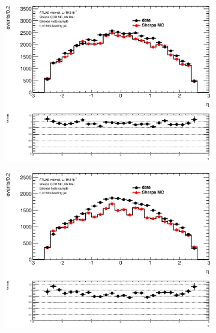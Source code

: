 \begin{figure}[phtb!]
\begin{center}
  \begin{subfigure}[$bbloose$ 4 jet category]{0.3\textwidth}\includegraphics[width=\textwidth]{MonteCarlo/figures/eta2_bbloose_4jets.eps}\end{subfigure}
  \begin{subfigure}[$bbloose$ 5+ jet category]{0.3\textwidth}\includegraphics[width=\textwidth]{MonteCarlo/figures/eta2_bbloose_5jets.eps}\end{subfigure}

\end{center}
\end{figure}
